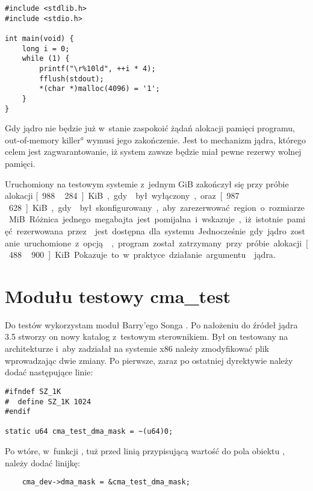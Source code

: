 \begin{lstlisting}[float=tb,caption=Prosty program testujący alokację
    pamięci.,label=lst:malloc]
#include <stdlib.h>
#include <stdio.h>

int main(void) {
	long i = 0;
	while (1) {
		printf("\r%10ld", ++i * 4);
		fflush(stdout);
		*(char *)malloc(4096) = '1';
	}
}
\end{lstlisting}

Gdy jądro nie będzie już w~stanie zaspokoić żądań alokacji pamięci
programu, \ang*{out-of-memory killer} wymusi jego zakończenie.  Jest
to mechanizm jądra, którego celem jest zagwarantowanie, iż system
zawsze będzie miał pewne rezerwy wolnej pamięci.

Uruchomiony na testowym systemie z~jednym \unit{GiB} zakończył się
przy próbie alokacji \unit[988\,284]{KiB}, gdy  był
wyłączony, oraz \unit[987\,628]{KiB}, gdy  był
skonfigurowany, aby zarezerwować region o~rozmiarze \unit[512]{MiB}.
Różnica jednego megabajta jest pomijalna i~wskazuje, iż istotnie
pamięć rezerwowana przez  jest dostępna dla systemu.

Jednocześnie gdy jądro zostanie uruchomione z~opcją ,
program został zatrzymany przy próbie alokacji \unit[488\,900]{KiB}.
Pokazuje to w~praktyce działanie argumentu  jądra.


\section{Modułu testowy cma\_test}

Do testów  wykorzystam moduł Barry'ego Songa
\autocite{patch:cma-test}.  Po nałożeniu do źródeł jądra 3.5 stworzy
on nowy katalog  z~testowym sterownikiem.  Był on
testowany na architekturze  i~aby zadziałał na systemie x86 należy
zmodyfikować plik  wprowadzając dwie zmiany.  Po
pierwsze, zaraz po ostatniej dyrektywie  należy dodać
następujące linie:

\begin{lstlisting}
#ifndef SZ_1K
#  define SZ_1K 1024
#endif

static u64 cma_test_dma_mask = ~(u64)0;
\end{lstlisting}

Po wtóre, w~funkcji , tuż przed linią przypisującą
wartość do pola  obiektu ,
należy dodać linijkę:

\begin{lstlisting}
	cma_dev->dma_mask = &cma_test_dma_mask;
\end{lstlisting}

